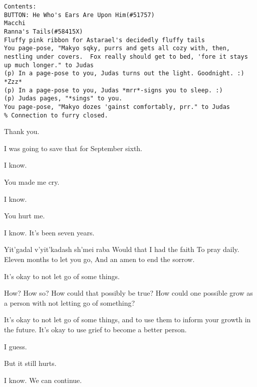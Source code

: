 \begin{verbatim}
Contents:
BUTTON: He Who's Ears Are Upon Him(#51757)
Macchi
Ranna's Tails(#58415X)
Fluffy pink ribbon for Astarael's decidedly fluffy tails
You page-pose, "Makyo sqky, purrs and gets all cozy with, then, nestling under covers.  Fox really should get to bed, 'fore it stays up much longer." to Judas
(p) In a page-pose to you, Judas turns out the light. Goodnight. :) *Zzz*
(p) In a page-pose to you, Judas *mrr*-signs you to sleep. :)
(p) Judas pages, "*sings" to you.
You page-pose, "Makyo dozes 'gainst comfortably, prr." to Judas
% Connection to furry closed.
\end{verbatim}
\newpage

\begin{ally}
Thank you.
\end{ally}
I was going to save that for September sixth.

\begin{ally}
I know.
\end{ally}
You made me cry.

\begin{ally}
I know.
\end{ally}
You hurt me.

\begin{ally}
I know. It's been seven years.
\end{ally}
Yit'gadal v'yit'kadash sh'mei raba Would that I had the faith To pray daily. Eleven months to let you go, And an amen to end the sorrow.

\begin{ally}
It's okay to not let go of some things.
\end{ally}
How? How so? How could that possibly be true? How could one possible grow as a person with not letting go of something?

\begin{ally}
It's okay to not let go of some things, and to use them to inform your growth in the future. It's okay to use grief to become a better person.
\end{ally}
I guess.

But it still hurts.

\begin{ally}
I know. We can continue.
\end{ally}
\newpage
